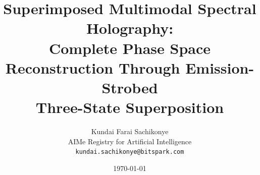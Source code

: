 \documentclass[11pt,twocolumn,a4paper]{article}
\theoremstyle{definition}
\theoremstyle{remark}
\begin{document}
\title{\textbf{Superimposed Multimodal Spectral Holography: \\[4pt]
Complete Phase Space Reconstruction Through Emission-Strobed \\[4pt]
Three-State Superposition}}

\author{
Kundai Farai Sachikonye\\
AIMe Registry for Artificial Intelligence\\
\texttt{kundai.sachikonye@bitspark.com}
}

\date{\today}

\maketitle

\end{document}
